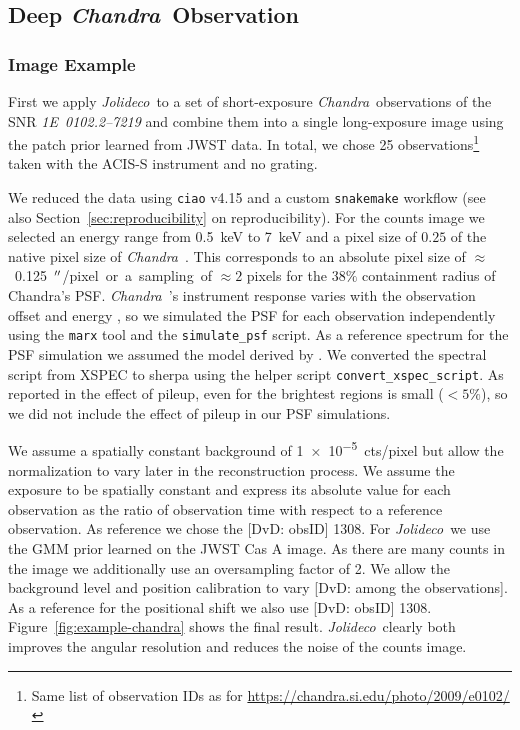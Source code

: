 \documentclass[twocolumn]{aastex631}
\newcommand{\chandra}{\textit{Chandra}~}
\newcommand{\jolideco}{\textit{Jolideco}~}
\newcommand{\dvd}[1]{{\color{red} [DvD: #1]}}
\begin{document}
    \subsection{Deep \chandra Observation}
    \subsubsection{Image Example}
    First we apply \jolideco to a set of short-exposure \chandra observations of the SNR \textit{1E~0102.2–7219} and combine them into a single long-exposure image using the patch prior learned from JWST data. In total, we chose 25 observations\footnote{Same list of observation IDs as for \url{https://chandra.si.edu/photo/2009/e0102/}} taken with  the ACIS-S instrument and no grating. 

    
    We reduced the data using \texttt{ciao} v4.15 and a custom \texttt{snakemake} workflow (see also Section~\ref{sec:reproducibility} on reproducibility). For the counts image we selected an energy range from \qty[mode = text]{0.5}{keV} to  \qty[mode = text]{7}{keV} and a pixel size of $0.25$ of the native pixel size of \chandra. This corresponds to an absolute  pixel size of $\approx$~\qty[mode = text]{0.125}{$\mbox{$^{\prime\prime}$}$/pixel} or a sampling of $\approx2$ pixels for the $38\%$ containment radius of Chandra's PSF. \chandra's instrument response varies with the observation offset and energy \citep{ChandraPOG2022}, so we simulated the PSF for each observation independently using the \texttt{marx} tool \citep{Davis2012} and the \texttt{simulate\_psf} script. As a reference spectrum for the PSF simulation we assumed the model derived by \cite{Plucinsky2017}. We converted the spectral script from XSPEC to sherpa using the helper script \texttt{convert\_xspec\_script}. As reported in \cite{Xi2019} the effect of pileup, even for the brightest regions is small ($<5\%$), so we did not include the effect of pileup in our PSF simulations. 

    We assume a spatially constant background of \qty[mode = text]{1e-5}{cts/pixel} but allow the normalization to vary later in the reconstruction process. We assume the exposure to be spatially constant and express its absolute value for each observation as the ratio of observation time with respect to a reference observation. As reference we chose the %
    \dvd{obsID} 1308. For \jolideco we use the GMM prior learned on the JWST Cas A image. As there are many counts in the image we additionally use an oversampling factor of 2. %
    We allow the background level and position calibration to vary \dvd{among the observations}. As a reference for the positional shift we also use \dvd{obsID} %
    1308. Figure~\ref{fig:example-chandra} shows the final result. \jolideco clearly both improves the angular resolution and reduces the noise of the counts image. 
\end{document}
